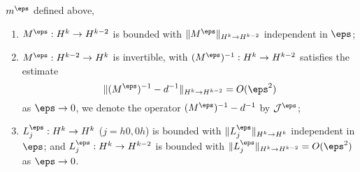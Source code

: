 
\begin{lemma}\label{estmult}$m^\eps$ defined above, 
\begin{enumerate}
\item $M^\eps : H^k \to H^{k-2}$ is bounded with $\|M^\eps\|_{H^k \to H^{k-2}}$ independent in $\eps$;

\item $M^\eps : H^{k-2} \to H^k$ is invertible, with $(M^\eps)^{-1} : H^k \to H^{k-2}$ satisfies the estimate \[
\|(M^\eps)^{-1} -d^{-1}\|_{H^k \to H^{k-2}} = O(\eps^2)
\] as $\eps \to 0$, we denote the operator $(M^\eps)^{-1}-d^{-1}$ by $\mathcal{J}^\eps$;

\item $L_{j}^{\eps} :H^k \to H^k$ ($j =h0,0h$) is bounded with $\|L_{j}^{\eps}\|_{H^k \to H^k}$ independent in $\eps$; and $L_j^{\eps} : H^k \to H^{k-2}$ is bounded with $\|L_{j}^{\eps}\|_{H^k \to H^{k-2}} = O(\eps^2)$ as $\eps \to 0$.

\end{enumerate}
\end{lemma}
